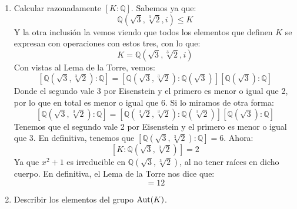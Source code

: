 \begin{ejercicio}
\begin{enumerate}
            donde:
            \begin{equation*}
                w = -\frac{1}{2}+i\frac{\sqrt{3}}{2}
            \end{equation*}
            Tenemos entonces que $\sqrt{3}\in K$ así como que:
            \begin{equation*}
                w = \frac{w\sqrt[3]{2}}{\sqrt[3]{2}} \in K
            \end{equation*}
            Por lo que $i\sqrt{3}\in K$, de donde:
            \begin{equation*}
                i = \frac{i\sqrt{3}}{\sqrt{3}} \in K
            \end{equation*}
            Por tanto, tenemos que $i+\sqrt{3}\in K$.
        \item Calcular razonadamente $[K:\mathbb{Q}]$.
            Sabemos ya que:
            \begin{equation*}
                \mathbb{Q}\left(\sqrt{3},\sqrt[3]{2},i\right)\leq K
            \end{equation*}
            Y la otra inclusión la vemos viendo que todos los elementos que definen $K$ se expresan con operaciones con estos tres, con lo que:
            \begin{equation*}
                K = \mathbb{Q}\left(\sqrt{3},\sqrt[3]{2},i\right)
            \end{equation*}
            Con vistas al Lema de la Torre, vemos:
            \begin{equation*}
                \left[\mathbb{Q}\left(\sqrt{3},\sqrt[3]{2}\right):\mathbb{Q}\right] = \left[\mathbb{Q}\left(\sqrt{3},\sqrt[3]{2}\right):\mathbb{Q}\left(\sqrt{3}\right)\right] \left[\mathbb{Q}\left(\sqrt{3}\right):\mathbb{Q}\right]
            \end{equation*}
            Donde el segundo vale 3 por Eisenstein y el primero es menor o igual que 2, por lo que en total es menor o igual que 6. Si lo miramos de otra forma:
            \begin{equation*}
                \left[\mathbb{Q}\left(\sqrt{3},\sqrt[3]{2}\right):\mathbb{Q}\right] = \left[\mathbb{Q}\left(\sqrt[3]{2},\sqrt[3]{2}\right):\mathbb{Q}\left(\sqrt[3]{2}\right)\right] \left[\mathbb{Q}\left(\sqrt{3}\right):\mathbb{Q}\right]
            \end{equation*}
            Tenemos que el segundo vale 2 por Eisenstein y el primero es menor o igual que 3. En definitiva, tenemos que $\left[\mathbb{Q}\left(\sqrt{3},\sqrt[3]{2}\right):\mathbb{Q}\right] =6$. Ahora:
            \begin{equation*}
                \left[K:\mathbb{Q}\left(\sqrt{3},\sqrt[3]{2}\right)\right] = 2
            \end{equation*}
            Ya que $x^2+1$ es irreducible en $\mathbb{Q}\left(\sqrt{3},\sqrt[3]{2}\right)$, al no tener raíces en dicho cuerpo. En definitiva, el Lema de la Torre nos dice que:
            \begin{equation*}
                [K:\mathbb{Q}] = 12
            \end{equation*}
        \item Describir los elementos del grupo $\operatorname{Aut}(K)$.


\end{enumerate}
\end{ejercicio}
